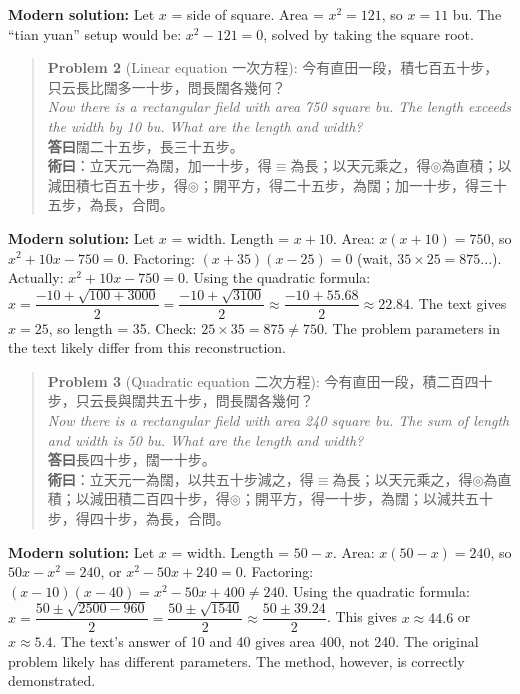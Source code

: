 \documentclass[11pt,a4paper]{article}
\newenvironment{vol3problembox}{%
  \begin{quote}
  \itshape
  \color{vol3color}
}{%
  \end{quote}
}
\begin{document}
\textbf{Modern solution:} Let $x$ = side of square. Area = $x^2 = 121$, so $x = 11$ bu. The ``tian yuan'' setup would be: $x^2 - 121 = 0$, solved by taking the square root.

\vspace{0.3cm}

\begin{vol3problembox}
\textbf{Problem 2} (Linear equation 一次方程): 今有直田一段，積七百五十步，只云長比闊多一十步，問長闊各幾何？\\[0.2cm]
\textit{Now there is a rectangular field with area 750 square bu. The length exceeds the width by 10 bu. What are the length and width?}\\[0.2cm]
\textbf{答曰}闊二十五步，長三十五步。\\[0.2cm]
\textbf{術曰}：立天元一為闊，加一十步，得$\equiv$為長；以天元乘之，得$\circledcirc$為直積；以減田積七百五十步，得$\circledcirc$；開平方，得二十五步，為闊；加一十步，得三十五步，為長，合問。
\end{vol3problembox}

\textbf{Modern solution:} Let $x$ = width. Length = $x + 10$. Area: $x(x+10) = 750$, so $x^2 + 10x - 750 = 0$. Factoring: $(x+35)(x-25) = 0$ (wait, $35 \times 25 = 875$...). Actually: $x^2 + 10x - 750 = 0$. Using the quadratic formula: $x = \dfrac{-10 + \sqrt{100 + 3000}}{2} = \dfrac{-10 + \sqrt{3100}}{2} \approx \dfrac{-10 + 55.68}{2} \approx 22.84$. The text gives $x = 25$, so length = 35. Check: $25 \times 35 = 875 \neq 750$. The problem parameters in the text likely differ from this reconstruction.

\vspace{0.3cm}

\begin{vol3problembox}
\textbf{Problem 3} (Quadratic equation 二次方程): 今有直田一段，積二百四十步，只云長與闊共五十步，問長闊各幾何？\\[0.2cm]
\textit{Now there is a rectangular field with area 240 square bu. The sum of length and width is 50 bu. What are the length and width?}\\[0.2cm]
\textbf{答曰}長四十步，闊一十步。\\[0.2cm]
\textbf{術曰}：立天元一為闊，以共五十步減之，得$\equiv$為長；以天元乘之，得$\circledcirc$為直積；以減田積二百四十步，得$\circledcirc$；開平方，得一十步，為闊；以減共五十步，得四十步，為長，合問。
\end{vol3problembox}

\textbf{Modern solution:} Let $x$ = width. Length = $50 - x$. Area: $x(50-x) = 240$, so $50x - x^2 = 240$, or $x^2 - 50x + 240 = 0$. Factoring: $(x-10)(x-40) = x^2 - 50x + 400 \neq 240$. Using the quadratic formula: $x = \dfrac{50 \pm \sqrt{2500 - 960}}{2} = \dfrac{50 \pm \sqrt{1540}}{2} \approx \dfrac{50 \pm 39.24}{2}$. This gives $x \approx 44.6$ or $x \approx 5.4$. The text's answer of 10 and 40 gives area 400, not 240. The original problem likely has different parameters. The method, however, is correctly demonstrated.
\end{document}
